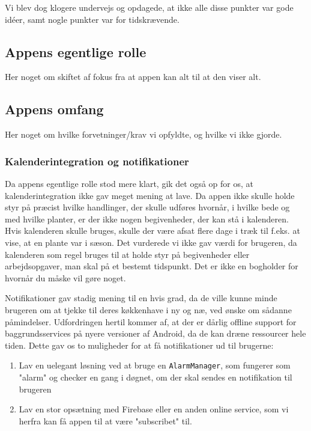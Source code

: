 Vi blev dog klogere undervejs og opdagede, at ikke alle disse punkter var gode idéer, samt nogle punkter var for tidskrævende.

\subsection{Appens egentlige rolle}
Her noget om skiftet af fokus fra at appen kan alt til at den viser alt.

\subsection{Appens omfang}
Her noget om hvilke forvetninger/krav vi opfyldte, og hvilke vi ikke gjorde.

\subsubsection{Kalenderintegration og notifikationer}
Da appens egentlige rolle stod mere klart, gik det også op for os, at kalenderintegration ikke gav meget mening at lave. Da appen ikke skulle holde styr på præcist hvilke handlinger, der skulle udføres hvornår, i hvilke bede og med hvilke planter, er der ikke nogen begivenheder, der kan stå i kalenderen. Hvis kalenderen skulle bruges, skulle der være afsat flere dage i træk til f.eks. at vise, at en plante var i sæson. Det vurderede vi ikke gav værdi for brugeren, da kalenderen som regel bruges til at holde styr på begivenheder eller arbejdsopgaver, man skal på et bestemt tidspunkt. Det er ikke en bogholder for hvornår du måske vil gøre noget.

Notifikationer gav stadig mening til en hvis grad, da de ville kunne minde brugeren om at tjekke til deres køkkenhave i ny og næ, ved ønske om sådanne påmindelser. Udfordringen hertil kommer af, at der er dårlig offline support for baggrundsservices på nyere versioner af Android, da de kan dræne ressourcer hele tiden. Dette gav os to muligheder for at få notifikationer ud til brugerne:

\begin{enumerate}
    \item Lav en uelegant løsning ved at bruge en \texttt{AlarmManager}, som fungerer som "alarm" og checker en gang i døgnet, om der skal sendes en notifikation til brugeren
    \item Lav en stor opsætning med Firebase eller en anden online service, som vi herfra kan få appen til at være "subscribet" til.
\end{enumerate}

